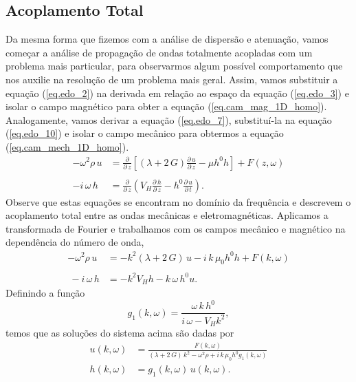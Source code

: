 \subsection{Acoplamento Total}
Da mesma forma que fizemos com a an\'alise de dispers\~ao e atenua\c{c}\~ao, vamos come\c{c}ar a an\'alise de propaga\c{c}\~ao de ondas totalmente acopladas com um problema mais particular, para observarmos algum poss\'ivel comportamento que nos auxilie na resolu\c{c}\~ao de um problema mais geral. Assim, vamos substituir a equa\c{c}\~ao (\ref{eq.edo_2}) na derivada em rela\c{c}\~ao ao espa\c{c}o da equa\c{c}\~ao (\ref{eq.edo_3}) e isolar o campo magn\'etico para obter a equa\c{c}\~ao (\ref{eq.cam_mag_1D_homo}). Analogamente, vamos derivar a equa\c{c}\~ao (\ref{eq.edo_7}), substitu\'i-la na equa\c{c}\~ao (\ref{eq.edo_10}) e isolar o campo mec\^anico para obtermos a equa\c{c}\~ao (\ref{eq.cam_mech_1D_homo}).
\begin{align}\label{eq.cam_mech_1D_homo}
-\omega^2\rho\,u&=\frac{\partial}{\partial\,z}\left[(\lambda+2\,G)\frac{\partial\,u}{\partial\,z}-\mu h^0h\right]+F(z,\omega)\\\nonumber\\\label{eq.cam_mag_1D_homo}
-i\,\omega\,h&=\frac{\partial}{\partial\,z}\left(V_H\frac{\partial\,h}{\partial\,z}-h^0\frac{\partial\,u}{\partial\,t}\right).
\end{align}
Observe que estas equa\c{c}\~oes se encontram no dom\'inio da frequ\^encia e descrevem o acoplamento total entre as ondas mec\^anicas e eletromagn\'eticas. Aplicamos a transformada de Fourier e trabalhamos com os campos mec\^anico e magn\'etico na depend\^encia do n\'umero de onda,
\begin{align}
-\omega^2\rho\,u&=-k^2(\lambda+2\,G)\,u-i\,k\,\mu_0h^0h+F(k,\omega)\\\nonumber\\\
-i\,\omega\,h&=-k^2V_Hh-k\,\omega\,h^0u.
\end{align}
Definindo a fun\c{c}\~ao
\begin{equation}
g_1(k,\omega)=\frac{\omega\,k\,h^0}{i\,\omega-V_Hk^2},
\end{equation} 
temos que as solu\c{c}\~oes do sistema acima s\~ao dadas por
\begin{align*}
u(k,\omega)&=\frac{F(k,\omega)}{(\lambda+2\,G)\,k^2-\omega^2\rho+i\,k\,\mu_0h^0g_1(k,\omega)}\\
h(k,\omega)&=g_1(k,\omega)\,u(k,\omega).
\end{align*}

